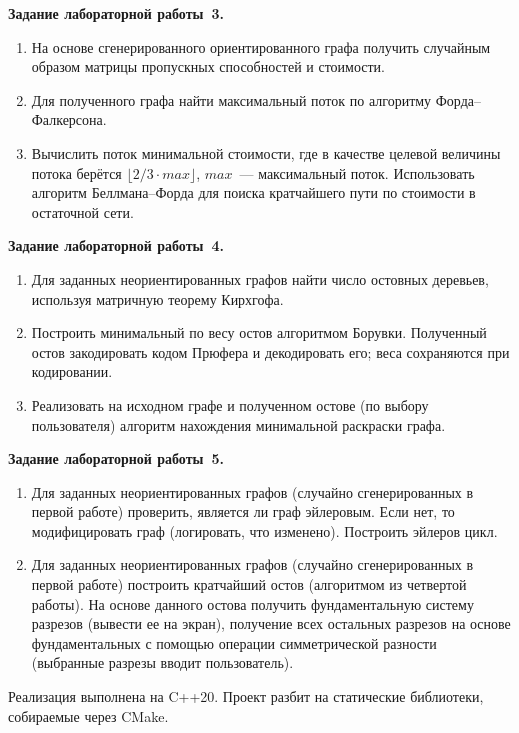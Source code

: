 \textbf{Задание лабораторной работы~3.}
\begin{enumerate}
    \item На основе сгенерированного ориентированного графа получить
    случайным образом матрицы пропускных способностей и стоимости.
    \item Для полученного графа найти максимальный поток по алгоритму
    Форда--Фалкерсона.
    \item Вычислить поток минимальной стоимости, где в качестве целевой
    величины потока берётся $\lfloor 2/3 \cdot \mathit{max} \rfloor$,
    $\mathit{max}$~--- максимальный поток. Использовать алгоритм
    Беллмана--Форда для поиска кратчайшего пути по стоимости
    в остаточной сети.
\end{enumerate}

\textbf{Задание лабораторной работы~4.}
\begin{enumerate}
    \item Для заданных неориентированных графов найти число остовных
    деревьев, используя матричную теорему Кирхгофа.
    \item Построить минимальный по весу остов алгоритмом Борувки.
    Полученный остов закодировать кодом Прюфера и декодировать его;
    веса сохраняются при кодировании.
    \item Реализовать на исходном графе и полученном остове (по выбору
    пользователя) алгоритм нахождения минимальной раскраски графа.
\end{enumerate}

\textbf{Задание лабораторной работы~5.}
\begin{enumerate}
    \item Для заданных неориентированных графов (случайно сгенерированных в первой работе) проверить,
    является ли граф эйлеровым. Если нет, то модифицировать граф (логировать, что изменено). Построить эйлеров цикл.
    \item Для заданных неориентированных графов (случайно сгенерированных в первой работе) построить кратчайший остов (алгоритмом из четвертой работы).
    На основе данного остова получить  фундаментальную систему разрезов (вывести ее на экран), получение всех остальных разрезов на основе фундаментальных
    с помощью операции симметрической разности (выбранные разрезы вводит пользователь).
\end{enumerate}




Реализация выполнена на C++20. Проект разбит на статические библиотеки,
собираемые через CMake.
